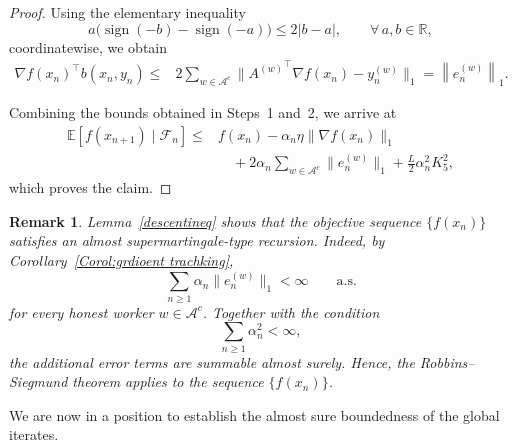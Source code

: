 \documentclass{article}
\newtheorem{remark}[theorem]{Remark}
\newcommand{\norm}[1]{\left\lVert #1 \right\rVert}
\DeclareMathOperator*{\sign}{sign}
\begin{document}
\begin{proof}
Using the elementary inequality
\[
a\big(\sign(-b)-\sign(-a)\big)
\le
2|b-a|,
\qquad
\forall\, a,b \in \mathbb{R},
\]
coordinatewise, we obtain
\[
\begin{aligned}
    \nabla f(x_n)^\top b(x_n,y_n)
    \le{}&
    2
    \sum_{w \in \mathcal{A}^c}
    \|
    {A^{(w)}}^\top \nabla f(x_n)
    -
    y_n^{(w)}
    \|_1  = \norm{e_n^{(w)}}_1.
\end{aligned}
\]

Combining the bounds obtained in Steps~1 and~2, we arrive at
\[
\begin{aligned}
    \mathbb{E}[f(x_{n+1}) \mid \mathcal{F}_n]
    \le{}&
    f(x_n)
    -
    \alpha_n \eta \|\nabla f(x_n)\|_1
    \\
    &\quad
    +
    2\alpha_n
    \sum_{w \in \mathcal{A}^c}
    \|e_n^{(w)}\|_1
    +
    \frac{L}{2}\alpha_n^2 K_5^2 ,
\end{aligned}
\]
which proves the claim.
\end{proof}

\begin{remark}
Lemma~\ref{descentineq} shows that the objective sequence $\{f(x_n)\}$ satisfies an almost supermartingale-type recursion. Indeed, by Corollary~\ref{Corol:grdioent trachking},
\[
\sum_{n\ge1}
\alpha_n \|e_n^{(w)}\|_1
<
\infty
\qquad \text{a.s.}
\]
for every honest worker $w \in \mathcal{A}^c$. Together with the condition
\[
\sum_{n\ge1} \alpha_n^2 < \infty,
\]
the additional error terms are summable almost surely. Hence, the Robbins--Siegmund theorem applies to the sequence $\{f(x_n)\}$.
\end{remark}

We are now in a position to establish the almost sure boundedness of the global iterates.
\end{document}
